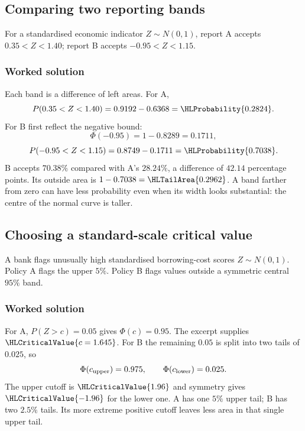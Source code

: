 \subsection{Comparing two reporting bands}\label{prob:sec:general-worked1}
For a standardised economic indicator $Z\sim N(0,1)$, report A accepts $0.35<Z<1.40$; report B accepts $-0.95<Z<1.15$.
\subsubsection*{Worked solution}\label{sol:sec:general-worked1}
Each band is a difference of left areas. For A,
\[
P(0.35<Z<1.40)=0.9192-0.6368=\HLProbability{0.2824}.
\]
For B first reflect the negative bound:
\[
\Phi(-0.95)=1-0.8289=0.1711,
\]
\[
P(-0.95<Z<1.15)=0.8749-0.1711=\HLProbability{0.7038}.
\]
B accepts $70.38\%$ compared with A's $28.24\%$, a difference of $42.14$ percentage points. Its outside area is $1-0.7038=\HLTailArea{0.2962}$. A band farther from zero can have less probability even when its width looks substantial: the centre of the normal curve is taller.


\subsection{Choosing a standard-scale critical value}\label{prob:sec:general-worked2}
A bank flags unusually high standardised borrowing-cost scores $Z\sim N(0,1)$. Policy A flags the upper $5\%$. Policy B flags values outside a symmetric central $95\%$ band.
\subsubsection*{Worked solution}\label{sol:sec:general-worked2}
For A, $P(Z>c)=0.05$ gives $\Phi(c)=0.95$. The excerpt supplies $\HLCriticalValue{c=1.645}$. For B the remaining $0.05$ is split into two tails of $0.025$, so
\[
\Phi(c_{\rm upper})=0.975,\qquad \Phi(c_{\rm lower})=0.025.
\]
The upper cutoff is $\HLCriticalValue{1.96}$ and symmetry gives $\HLCriticalValue{-1.96}$ for the lower one. A has one $5\%$ upper tail; B has two $2.5\%$ tails. Its more extreme positive cutoff leaves less area in that single upper tail.
